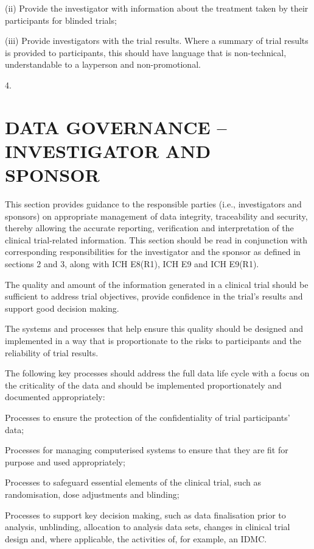 \documentclass[11pt]{article}
\begin{document}
(ii) Provide the investigator with information about the treatment taken by their participants for blinded trials;


(iii) Provide investigators with the trial results. Where a summary of trial results is provided to participants, this should have language that is non-technical, understandable to a layperson and non-promotional.


4.


\section{DATA GOVERNANCE -- INVESTIGATOR AND SPONSOR}

This section provides guidance to the responsible parties (i.e., investigators and sponsors) on appropriate management of data integrity, traceability and security, thereby allowing the accurate reporting, verification and interpretation of the clinical trial-related information. This section should be read in conjunction with corresponding responsibilities for the investigator and the sponsor as defined in sections 2 and 3, along with ICH E8(R1), ICH E9 and ICH E9(R1).


The quality and amount of the information generated in a clinical trial should be sufficient to address trial objectives, provide confidence in the trial's results and support good decision making.


The systems and processes that help ensure this quality should be designed and implemented in a way that is proportionate to the risks to participants and the reliability of trial results.


The following key processes should address the full data life cycle with a focus on the criticality of the data and should be implemented proportionately and documented appropriately:


\begin{description}[leftmargin=2.5cm,style=sameline]

\item[(a)] Processes to ensure the protection of the confidentiality of trial participants' data;

\item[(b)] Processes for managing computerised systems to ensure that they are fit for purpose and used appropriately;

\item[(c)] Processes to safeguard essential elements of the clinical trial, such as randomisation, dose adjustments and blinding;

\item[(d)] Processes to support key decision making, such as data finalisation prior to analysis, unblinding, allocation to analysis data sets, changes in clinical trial design and, where applicable, the activities of, for example, an IDMC.

\end{description}
\end{document}
